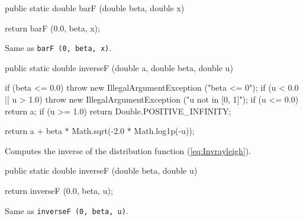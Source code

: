 \begin{code}

   public static double barF (double beta, double x)\begin{hide} {
      return barF (0.0, beta, x);
   }\end{hide}
\end{code}
\begin{tabb} Same as \texttt{barF (0, beta, x)}.
\end{tabb}
\begin{htmlonly}
\end{htmlonly}
\begin{code}

   public static double inverseF (double a, double beta, double u)\begin{hide} {
      if (beta <= 0.0)
         throw new IllegalArgumentException ("beta <= 0");
      if (u < 0.0 || u > 1.0)
          throw new IllegalArgumentException ("u not in [0, 1]");
      if (u <= 0.0)
         return a;
      if (u >= 1.0)
         return Double.POSITIVE_INFINITY;

      return a + beta * Math.sqrt(-2.0 * Math.log1p(-u));
   }\end{hide}
\end{code}
  \begin{tabb}
  Computes the inverse of the distribution function (\ref{eq:Invrayleigh}).
 \end{tabb}
\begin{htmlonly}
\end{htmlonly}
\begin{code}

   public static double inverseF (double beta, double u)\begin{hide} {
      return inverseF (0.0, beta, u);
   }\end{hide}
\end{code}
\begin{tabb} Same as \texttt{inverseF (0, beta, u)}.
\end{tabb}
\begin{htmlonly}
\end{htmlonly}
